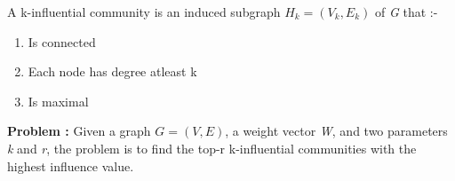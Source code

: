 \documentclass[conference]{IEEEtran}
\begin{document}
A k-influential community \cite{Li:2015:ICS:2735479.2735484} is an induced subgraph \begin{math}H_k = (V_k,E_k)\end{math} of \textit{G} that :-
\begin{enumerate}
\item Is connected
\item Each node has degree atleast k
\item Is maximal
\end{enumerate}

\textbf{Problem :} Given a graph \begin{math}G = (V, E)\end{math}, a weight vector \textit{W}, and two parameters \textit{k} and \textit{r}, the problem is to find the top-r k-influential communities with the highest influence value. \cite{Li:2015:ICS:2735479.2735484}







\end{document}
